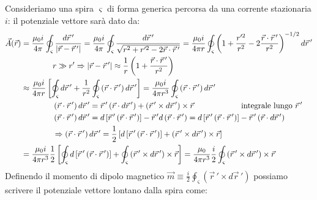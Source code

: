 Consideriamo una spira $ \varsigma $ di forma generica percorsa da una corrente stazionaria $ i $: il potenziale vettore sarà dato da:
\begin{equation}
	\begin{split}
		\vec{A}(\vec{r}) &= \displaystyle\frac{\mu_0 i}{4\pi} \oint_{\varsigma} \displaystyle\frac{d\vec{r}\,'}{\left\lvert\vec{r} - \vec{r}\,'\right\rvert} = \displaystyle\frac{\mu_0 i}{4\pi} \oint_{\varsigma} \displaystyle\frac{d\vec{r}\,'}{\sqrt{r^2 + r'^2 - 2\vec{r}\cdot\vec{r}\,'}} = \displaystyle\frac{\mu_0 i}{4\pi r} \oint_{\varsigma} \left( 1 + \displaystyle\frac{r'^2}{r^2} - 2 \displaystyle\frac{\vec{r}\cdot\vec{r}\,'}{r^2} \right)^{-1/2} d\vec{r}\,' \\ 
				 & \qquad\qquad r \gg r' \Rightarrow \left\lvert\vec{r} - \vec{r}\,'\right\rvert \approx \frac{1}{r} \left(1 + \frac{\vec{r}\cdot\vec{r}\,'}{r^2}\right) \\ 
				 &\approx \displaystyle\frac{\mu_0 i}{4\pi r} \left[ \oint_{\varsigma} d\vec{r}\,' + \displaystyle\frac{1}{r^2} \oint_{\varsigma} \left( \vec{r}\cdot\vec{r}\,' \right) d\vec{r}\,' \right] = \displaystyle\frac{\mu_0 i}{4\pi r^3} \oint_{\varsigma} \left( \vec{r}\cdot\vec{r}\,' \right) d\vec{r}\,' \\ 
				 & \qquad\qquad \left(\vec{r}\cdot\vec{r}\,'\right) d\vec{r}\,' = \vec{r}\,' \left(\vec{r}\cdot d\vec{r}\,'\right) + \left(\vec{r}\,'\times d\vec{r}\,'\right)\times\vec{r} \qquad \qquad \qquad \text{integrale lungo } \vec{r}\,' \\ 
				 & \qquad\qquad \left(\vec{r}\cdot\vec{r}\,'\right) d\vec{r}\,' = d\left[\vec{r}\,'\left(\vec{r}\cdot\vec{r}\,'\right)\right] - \vec{r}\,'d\left(\vec{r}\cdot\vec{r}\,'\right) = d\left[\vec{r}\,'\left(\vec{r}\cdot\vec{r}\,'\right)\right] - \vec{r}\,'\left(\vec{r}\cdot d\vec{r}\,'\right) \\ 
				 & \qquad \qquad \Rightarrow \left(\vec{r}\cdot\vec{r}\,'\right)d\vec{r}\,' = \frac{1}{2} \left[ d\left[ \vec{r}\,' \left(\vec{r}\cdot\vec{r}\,'\right)\right] + \left(\vec{r}\,' \times d\vec{r}\,'\right) \times\vec{r} \right] \\ 
				 &= \displaystyle\frac{\mu_0 i}{4\pi r^3} \displaystyle\frac{1}{2} \left[ \oint_{\varsigma} d\left[ \vec{r}\,' \left(\vec{r}\cdot\vec{r}\,'\right)\right] + \oint_{\varsigma} \left(\vec{r}\,' \times d\vec{r}\,'\right) \times\vec{r} \right] = \displaystyle\frac{\mu_0}{4\pi r^3} \displaystyle\frac{i}{2} \oint_{\varsigma} \left(\vec{r}\,' \times d\vec{r}\,'\right) \times\vec{r} 
	\end{split}
	\label{eq:pot-vett-sp}
\end{equation}
Definendo il momento di dipolo magnetico $ \vec{m} \equiv \frac{i}{2} \oint_{\varsigma} \left(\vec{r}\,'\times d\vec{r}\,'\right) $ possiamo scrivere il potenziale vettore lontano dalla spira come:
